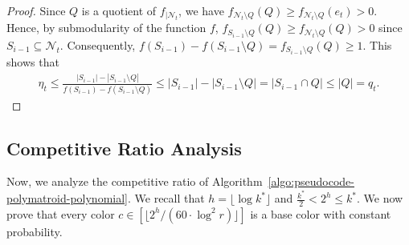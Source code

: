 \documentclass[11pt]{article}
\theoremstyle{definition}
\begin{document}
\begin{proof}
    Since $Q$ is a quotient of $f_{|\mathcal{N}_t}$, we have $f_{\mathcal{N}_t\setminus Q}(Q)\geq f_{\mathcal{N}_t\setminus Q}(e_t)>0$. Hence, by submodularity of the function $f$, $f_{S_{i-1}\setminus Q}(Q)\geq f_{\mathcal{N}_t\setminus Q}(Q)>0$ since $S_{i-1}\subseteq \mathcal{N}_t$. Consequently, $f(S_{i-1})-f(S_{i-1}\setminus Q)=f_{S_{i-1}\setminus Q}(Q)\geq 1$. This shows that
    $$\begin{aligned}
        \eta_t \leq \frac{|S_{i-1}|-|S_{i-1}\setminus Q|}{f(S_{i-1})-f(S_{i-1}\setminus Q)} \leq |S_{i-1}|-|S_{i-1}\setminus Q|=|S_{i-1}\cap Q| \leq |Q| = q_t.
    \end{aligned}$$
\end{proof}

\subsection{Competitive Ratio Analysis}
Now, we analyze the competitive ratio of Algorithm~\ref{algo:pseudocode-polymatroid-polynomial}. We recall that $h=\lfloor \log k^* \rfloor$ and $\frac{k^*}{2}< 2^h \leq k^*$. We now prove that every color $c\in [\lfloor 2^h/(60\cdot \log ^2 r)\rfloor]$ is a base color with constant probability.
\end{document}
